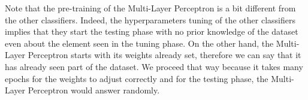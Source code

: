 Note that the pre-training of the Multi-Layer Perceptron is a bit different
from the other classifiers. Indeed, the hyperparameters tuning of the other
classifiers implies that they start the testing phase with no prior knowledge
of the dataset even about the element seen in the tuning phase. On the other
hand, the Multi-Layer Perceptron starts with its weights already set,
therefore we can say that it has already seen part of the dataset. We proceed
that way because it takes many epochs for the weights to adjust correctly and
for the testing phase, the Multi-Layer Perceptron would answer randomly.
